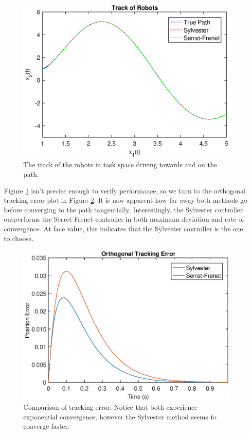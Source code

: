 \begin{figure}[!htbp]
    \centering
    \includegraphics{images/tfl_compare_task.eps}
    \caption{The track of the robots in task space driving towards and on the path.}
    \label{fig:tfl_compare_task}
\end{figure}
Figure \ref{fig:tfl_compare_task} isn't precise enough to verify performance, so we turn to the orthogonal tracking error plot in Figure \ref{fig:tfl_compare_tracking}. It is now apparent how far away both methods go before converging to the path tangentially. Interestingly, the Sylvester controller outperforms the Serret-Frenet controller in both maximum deviation and rate of convergence. At face value, this indicates that the Sylvester controller is the one to choose.
\begin{figure}[!htbp]
    \centering
    \includegraphics{images/tfl_compare_tracking.eps}
    \caption{Comparison of tracking error. Notice that both experience exponential convergence, however the Sylvester method seems to converge faster.}
    \label{fig:tfl_compare_tracking}
\end{figure}

